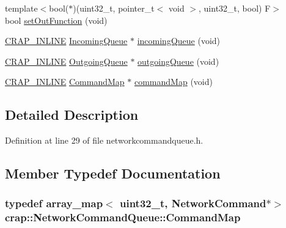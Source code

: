 \begin{DoxyCompactItemize}
\item 
{\footnotesize template$<$bool($\ast$)(uint32\+\_\+t, pointer\+\_\+t$<$ void $>$, uint32\+\_\+t, bool) F$>$ }\\bool \hyperlink{classcrap_1_1_network_command_queue_adbb95d4ee555106c5a5c80d627ca86d4}{set\+Out\+Function} (void)
\item 
\hyperlink{config__x86_8h_a5a40526b8d842e7ff731509998bb0f1c}{C\+R\+A\+P\+\_\+\+I\+N\+L\+I\+N\+E} \hyperlink{classcrap_1_1_network_command_queue_af70b69ccb9dc80c2eb26ab25d7c3e6bc}{Incoming\+Queue} $\ast$ \hyperlink{classcrap_1_1_network_command_queue_ad344b1c5f3262d0c9f69c5adc903d964}{incoming\+Queue} (void)
\item 
\hyperlink{config__x86_8h_a5a40526b8d842e7ff731509998bb0f1c}{C\+R\+A\+P\+\_\+\+I\+N\+L\+I\+N\+E} \hyperlink{classcrap_1_1_network_command_queue_a1e9973cba21e86ff5e49981e4d45c527}{Outgoing\+Queue} $\ast$ \hyperlink{classcrap_1_1_network_command_queue_a35815c321d253caf1d3c4af39b37d0bf}{outgoing\+Queue} (void)
\item 
\hyperlink{config__x86_8h_a5a40526b8d842e7ff731509998bb0f1c}{C\+R\+A\+P\+\_\+\+I\+N\+L\+I\+N\+E} \hyperlink{classcrap_1_1_network_command_queue_a95baa8d1062378159d610e09d8eb8d09}{Command\+Map} $\ast$ \hyperlink{classcrap_1_1_network_command_queue_a6681ea1a54a0b924ed27b0795432c446}{command\+Map} (void)
\end{DoxyCompactItemize}


\subsection{Detailed Description}


Definition at line 29 of file networkcommandqueue.\+h.



\subsection{Member Typedef Documentation}
\hypertarget{classcrap_1_1_network_command_queue_a95baa8d1062378159d610e09d8eb8d09}{}
\subsubsection[{Command\+Map}]{\setlength{\rightskip}{0pt plus 5cm}typedef {\bf array\+\_\+map}$<$ uint32\+\_\+t, {\bf Network\+Command}$\ast$$>$ {\bf crap\+::\+Network\+Command\+Queue\+::\+Command\+Map}}\label{classcrap_1_1_network_command_queue_a95baa8d1062378159d610e09d8eb8d09}


